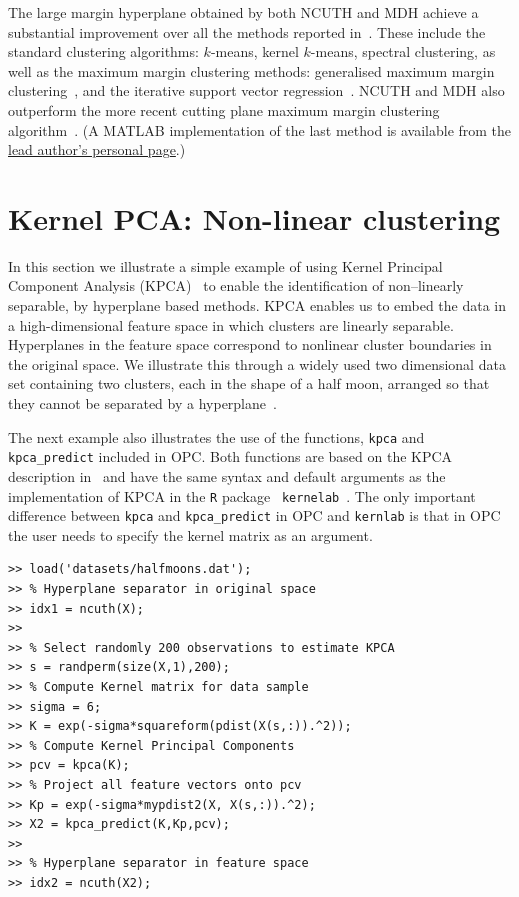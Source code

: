 \documentclass{book}
\begin{document}
\noindent
%
The large margin hyperplane obtained by both NCUTH and MDH achieve a
substantial improvement over all the methods reported
in~\cite[Table~IV]{ZhangTK2009}. These include the standard clustering
algorithms: $k$-means, kernel $k$-means, spectral clustering, as well as
the maximum margin clustering methods: generalised maximum margin
clustering~\cite{Valizadegan2006}, and the iterative support vector regression~\cite{ZhangTK2009}.
NCUTH and MDH also outperform the more recent cutting plane maximum margin
clustering algorithm~\cite{WangZZ2010}. (A MATLAB implementation of the last
method is available from the
\href{https://sites.google.com/site/binzhao02/CPMMC.rar?attredirects=0} {lead
author's personal page}.)



\section{Kernel PCA: Non-linear clustering}\label{sec:kpca}

In this section we illustrate a simple example of using Kernel Principal
Component Analysis (KPCA)~\cite{ScholkopfSM1998} to enable the identification of
non--linearly separable, by hyperplane based methods.
%
KPCA enables us to embed the data in a high-dimensional feature space in which
clusters are linearly separable. Hyperplanes in the feature space correspond to
nonlinear cluster boundaries in the original space.  We illustrate this through
a widely used two dimensional data set containing two clusters, each in the
shape of a half moon, arranged so that they cannot be separated by a
hyperplane~\cite{Jain2005}. 

The next example also illustrates the use of the functions, {\tt kpca} and {\tt
kpca\_predict} included in OPC. Both functions are based on the KPCA
description in~\cite{ScholkopfSM1998} and have the same syntax and default
arguments as the implementation of KPCA in the {\tt R} package {\tt
kernelab}~\cite{kernlab}. The only important difference between {\tt kpca} and
{\tt kpca\_predict} in OPC and {\tt kernlab} is that in OPC the user needs to
specify the kernel matrix as an argument. 


\begin{verbatim}
>> load('datasets/halfmoons.dat');
>> % Hyperplane separator in original space
>> idx1 = ncuth(X);
>>
>> % Select randomly 200 observations to estimate KPCA
>> s = randperm(size(X,1),200);
>> % Compute Kernel matrix for data sample
>> sigma = 6;
>> K = exp(-sigma*squareform(pdist(X(s,:)).^2));
>> % Compute Kernel Principal Components
>> pcv = kpca(K);
>> % Project all feature vectors onto pcv
>> Kp = exp(-sigma*mypdist2(X, X(s,:)).^2);
>> X2 = kpca_predict(K,Kp,pcv);
>>
>> % Hyperplane separator in feature space
>> idx2 = ncuth(X2);
\end{verbatim}
\end{document}
